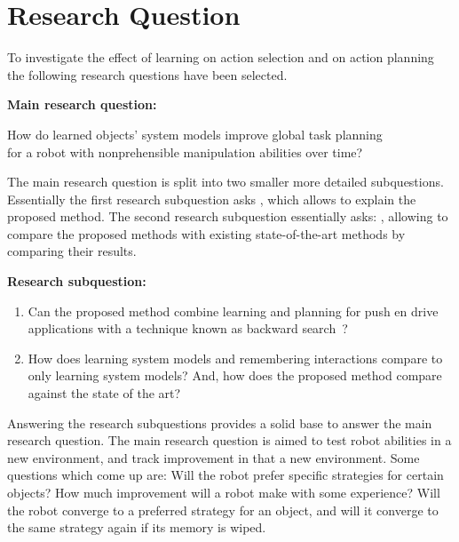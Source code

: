 \section{Research Question}%
\label{sec:research_question}
To investigate the effect of learning on action selection and on action planning the following research questions have been selected.\bs

\textbf{Main research question:}
\begin{center}%
\label{researchquestion:main}
\large
How do learned objects' system models improve global task planning\\for a robot with nonprehensible manipulation abilities over time?
\end{center}

The main research question is split into two smaller more detailed subquestions. Essentially the first research subquestion asks , which allows to explain the proposed method. The second research subquestion essentially asks: , allowing to compare the proposed methods with existing state-of-the-art methods by comparing their results.\bs

\textbf{Research subquestion:}
\begin{enumerate}
    \item\label{researchsubquestion:does_it_work} Can the proposed method combine learning and planning for push en drive applications with a technique known as backward search~\cite{krontiris_dealing_2015}?
    \item\label{researchsubquestion:does_it_compare} How does learning system models and remembering interactions compare to only learning system models? And, how does the proposed method compare against the state of the art?
\end{enumerate}

Answering the research subquestions provides a solid base to answer the main research question. The main research question is aimed to test robot abilities in a new environment, and track improvement in that a new environment. Some questions which come up are: Will the robot prefer specific strategies for certain objects? How much improvement will a robot make with some experience? Will the robot converge to a preferred strategy for an object, and will it converge to the same strategy again if its memory is wiped.\bs

